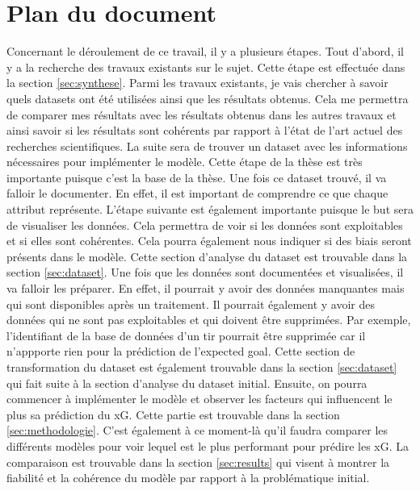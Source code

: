 \documentclass[12pt]{article}
\begin{document}
\section{Plan du document}
Concernant le déroulement de ce travail, il y a plusieurs étapes.
Tout d'abord, il y a la recherche des travaux existants sur le sujet.
Cette étape est effectuée dans la section \ref{sec:synthese}.
Parmi les travaux existants, je vais chercher à savoir quels datasets ont été utilisées ainsi que les résultats obtenus.
Cela me permettra de comparer mes résultats avec les résultats obtenus dans les autres travaux et ainsi savoir si les résultats sont cohérents par rapport à l'état de l'art actuel des recherches scientifiques.
\newline \newline
La suite sera de trouver un dataset avec les informations nécessaires pour implémenter le modèle.
Cette étape de la thèse est très importante puisque c'est la base de la thèse.
Une fois ce dataset trouvé, il va falloir le documenter. En effet, il est important de comprendre ce que chaque attribut représente.
L'étape suivante est également importante puisque le but sera de visualiser les données.
Cela permettra de voir si les données sont exploitables et si elles sont cohérentes.
Cela pourra également nous indiquer si des biais seront présents dans le modèle.
Cette section d'analyse du dataset est trouvable dans la section \ref{sec:dataset}.
\newline \newline
Une fois que les données sont documentées et visualisées, il va falloir les préparer.
En effet, il pourrait y avoir des données manquantes mais qui sont disponibles après un traitement.
Il pourrait également y avoir des données qui ne sont pas exploitables et qui doivent être supprimées.
Par exemple, l'identifiant de la base de données d'un tir pourrait être supprimée car il n'appporte rien pour la prédiction de l'expected goal.
Cette section de transformation du dataset est également trouvable dans la section \ref{sec:dataset} qui fait suite à la section d'analyse du dataset initial.
\newline \newline
Ensuite, on pourra commencer à implémenter le modèle et observer les facteurs qui influencent le plus sa prédiction du xG.
Cette partie est trouvable dans la section \ref{sec:methodologie}.
C'est également à ce moment-là qu'il faudra comparer les différents modèles pour voir lequel est le plus performant pour prédire les xG.
La comparaison est trouvable dans la section \ref{sec:results} qui visent à montrer la fiabilité et la cohérence du modèle par rapport à la problématique initial.
\end{document}
